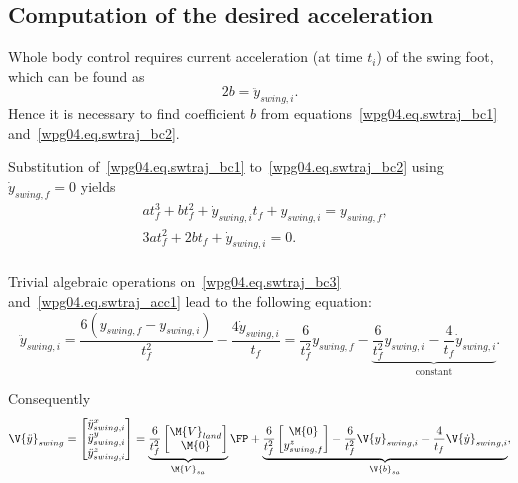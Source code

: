 \subsection{Computation of the desired acceleration}

Whole body control requires current acceleration (at time $t_i$) of the swing foot,
which can be found as
\begin{equation}\label{wpg04.eq.swtraj_acc1}
    2b = \ddot{y}_{swing,i}.
\end{equation}
Hence it is necessary to find coefficient $b$ from equations~\eqref{wpg04.eq.swtraj_bc1}
and~\eqref{wpg04.eq.swtraj_bc2}.

Substitution of~\eqref{wpg04.eq.swtraj_bc1} to~\eqref{wpg04.eq.swtraj_bc2} using $\dot{y}_{swing,f} = 0$
yields
\begin{equation}\label{wpg04.eq.swtraj_bc3}
\begin{split}
    & at_f^3 + bt_f^2 + \dot{y}_{swing,i}t_f + y_{swing,i} = y_{swing,f},\\
    & 3at_f^2 + 2bt_f + \dot{y}_{swing,i} = 0.\\
\end{split}
\end{equation}

Trivial algebraic operations on~\eqref{wpg04.eq.swtraj_bc3} and~\eqref{wpg04.eq.swtraj_acc1}
lead to the following equation:
\begin{equation}\label{wpg04.eq.swtraj_acc2}
    \ddot{y}_{swing,i}
    =
    \frac{6(y_{swing,f} - y_{swing,i})}{t_f^2} - \frac{4\dot{y}_{swing,i}}{t_f}
    =
    \frac{6}{t_f^2}y_{swing,f} -
    \underbrace{
        \frac{6}{t_f^2}y_{swing,i} - \frac{4}{t_f} \dot{y}_{swing,i}
    }_{\mbox{constant}}.
\end{equation}

Consequently
\begin{equation}
    \V{\ddot{y}}_{swing}
    =
    \begin{bmatrix}
        \ddot{y}_{swing,i}^x\\
        \ddot{y}_{swing,i}^y\\
        \ddot{y}_{swing,i}^z\\
    \end{bmatrix}
    =
    \underbrace{
        \frac{6}{t_f^2}
        \begin{bmatrix}
            \M{V}_{land} \\
            \M{0}
        \end{bmatrix}
    }_{\M{V}_{sa}}
    \FP
    +
    \underbrace{
        \frac{6}{t_f^2}
        \begin{bmatrix}
            \M{0} \\
            y_{swing,f}^z
        \end{bmatrix}
        -
        \frac{6}{t_f^2}
        \V{y}_{swing,i}
        -
        \frac{4}{t_f}
        \V{\dot{y}}_{swing,i}
    }_{\V{b}_{sa}},
\end{equation}


